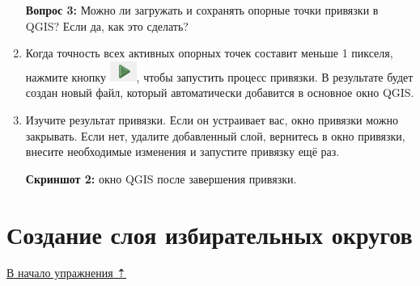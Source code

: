 \documentclass[
  12pt,
]{book}
\begin{document}
\begin{enumerate}
  \textbf{Вопрос 3:} Можно ли загружать и сохранять опорные точки привязки в QGIS? Если да, как это сделать?
\item
  Когда точность всех активных опорных точек составит меньше 1 пикселя, нажмите кнопку \includegraphics{images/Ex05/go.png}, чтобы запустить процесс привязки. В результате будет создан новый файл, который автоматически добавится в основное окно QGIS.
\item
  Изучите результат привязки. Если он устраивает вас, окно привязки можно закрывать. Если нет, удалите добавленный слой, вернитесь в окно привязки, внесите необходимые изменения и запустите привязку ещё раз.

  \textbf{Скриншот 2:} окно QGIS после завершения привязки.
\end{enumerate}

\hypertarget{map-ref-districts-creation}{%
\section{Создание слоя избирательных округов}\label{map-ref-districts-creation}}

\protect\hyperlink{map-ref-districts}{В начало упражнения ⇡}
\end{document}
